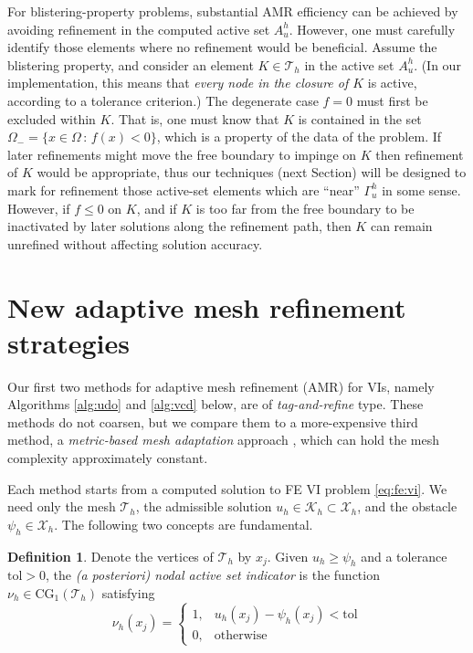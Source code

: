\documentclass[]{interact}
\theoremstyle{plain}%
\theoremstyle{definition}
\newtheorem{definition}[theorem]{Definition}
\theoremstyle{remark}
\newcommand{\cK}{\mathcal{K}}
\newcommand{\cT}{\mathcal{T}}
\newcommand{\cX}{\mathcal{X}}
\newcommand{\CG}{\text{CG}}
\begin{document}
For blistering-property problems, substantial AMR efficiency can be achieved by avoiding refinement in the computed active set $A_u^h$.  However, one must carefully identify those elements where no refinement would be beneficial.  Assume the blistering property, and consider an element $K\in \cT_h$ in the active set $A_u^h$.  (In our implementation, this means that \emph{every node in the closure of $K$} is active, according to a tolerance criterion.)  The degenerate case $f=0$ must first be excluded within $K$.  That is, one must know that $K$ is contained in the set $\Omega_- = \{x\in \Omega\,:\,f(x) < 0\}$, which is a property of the data of the problem.  If later refinements might move the free boundary to impinge on $K$ then refinement of $K$ would be appropriate, thus our techniques (next Section) will be designed to mark for refinement those active-set elements which are ``near'' $\Gamma_u^h$ in some sense.  However, if $f \le 0$ on $K$, and if $K$ is too far from the free boundary to be inactivated by later solutions along the refinement path, then $K$ can remain unrefined without affecting solution accuracy.


\section{New adaptive mesh refinement strategies} \label{sec:viamr}

Our first two methods for adaptive mesh refinement (AMR) for VIs, namely Algorithms \ref{alg:udo} and \ref{alg:vcd} below, are of \emph{tag-and-refine} type.  These methods do not coarsen, but we compare them to a more-expensive third method, a \emph{metric-based mesh adaptation} approach \cite{Wallworketal2020}, which can hold the mesh complexity approximately constant.

Each method starts from a computed solution to FE VI problem \eqref{eq:fe:vi}.  We need only the mesh $\cT_h$, the admissible solution $u_h \in \cK_h \subset \cX_h$, and the obstacle $\psi_h \in \cX_h$.  The following two concepts are fundamental.

\begin{definition} \label{def:nodalactive}
Denote the vertices of $\cT_h$ by $x_j$.  Given $u_h \ge \psi_h$ and a tolerance $\text{tol}>0$, the \emph{(a posteriori) nodal active set indicator} is the function $\nu_h\in\CG_1(\cT_h)$ satisfying
	$$\nu_h(x_j) = \begin{cases} 1, & u_h(x_j) - \psi_h(x_j) < \text{tol} \\
	                             0, & \text{otherwise}\end{cases}$$
\end{definition}
\end{document}
